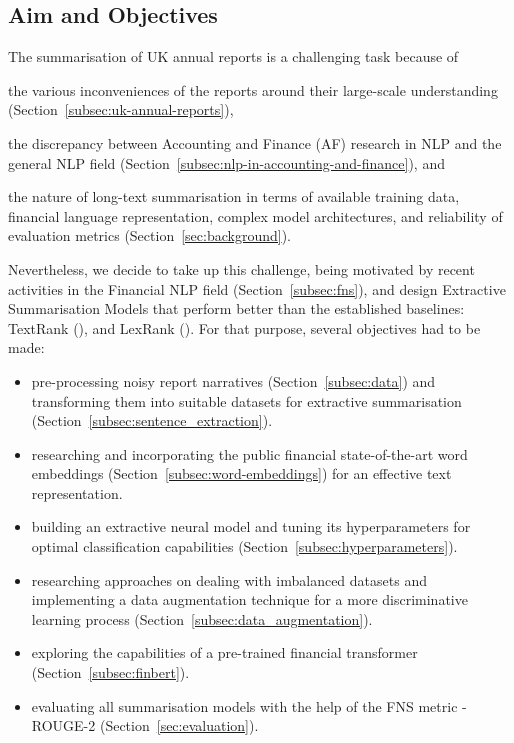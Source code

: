 \subsection{Aim and Objectives}\label{subsec:aim-and-objectives}
The summarisation of UK annual reports is a challenging task because of
 \begin{enumerate*}
     \item the various inconveniences of the reports around their large-scale understanding (Section~\ref{subsec:uk-annual-reports}),
     \item the discrepancy between Accounting and Finance (AF) research in NLP and the general NLP field (Section~\ref{subsec:nlp-in-accounting-and-finance}), and
     \item the nature of long-text summarisation in terms of available training data, financial language representation, complex model architectures, and reliability of evaluation metrics (Section~\ref{sec:background}).
 \end{enumerate*}
 Nevertheless, we decide to take up this challenge, being motivated by recent activities in the Financial NLP field (Section~\ref{subsec:fns}), and design Extractive Summarisation Models that perform better than the established baselines: TextRank (\cite{mihalcea-tarau-2004-textrank}), and LexRank (\cite{Erkan2004LexRankGC}).
 For that purpose, several objectives had to be made:
 \begin{itemize}
     \item pre-processing noisy report narratives (Section~\ref{subsec:data}) and transforming them into suitable datasets for extractive summarisation (Section~\ref{subsec:sentence_extraction}).
     \item researching and incorporating the public financial state-of-the-art word embeddings (Section~\ref{subsec:word-embeddings}) for an effective text representation.
     \item building an extractive neural model and tuning its hyperparameters for optimal classification capabilities (Section~\ref{subsec:hyperparameters}).
     \item researching approaches on dealing with imbalanced datasets and implementing a data augmentation technique for a more discriminative learning process (Section~\ref{subsec:data_augmentation}).
     \item exploring the capabilities of a pre-trained financial transformer (Section~\ref{subsec:finbert}).
     \item evaluating all summarisation models with the help of the FNS metric - ROUGE-2 (Section~\ref{sec:evaluation}).
 \end{itemize}